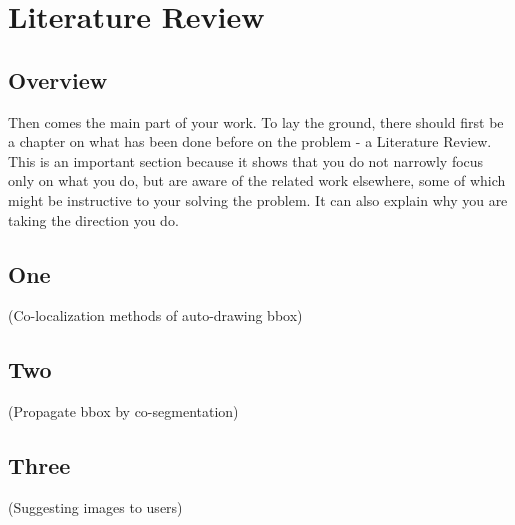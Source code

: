 
\chapter{Literature Review}
\begin{spacing}{1.5}
\setlength{\parskip}{0.3in}

\section{Overview}

Then comes the main part of your work. To lay the ground, there should first be a chapter on what has been done before on the problem - a Literature Review. This is an important section because it shows that you do not narrowly focus only on what you do, but are aware of the
related work elsewhere, some of which might be instructive to your solving the problem. It can also explain why you are taking the direction you do.

\section{One}
(Co-localization methods of auto-drawing bbox)

\section{Two}
(Propagate bbox by co-segmentation)

\section{Three}
(Suggesting images to users)


\end{spacing}
\newpage
